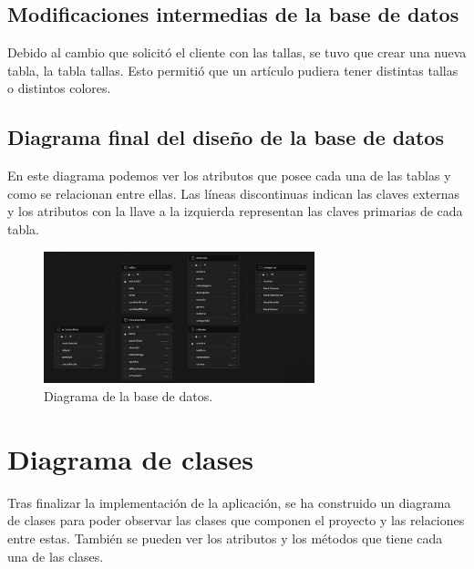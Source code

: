 \subsection{Modificaciones intermedias de la base de datos}

Debido al cambio que solicitó el cliente con las tallas, se tuvo que crear una nueva tabla, la tabla tallas. Esto permitió que un artículo pudiera tener distintas tallas o distintos colores. 


\subsection{Diagrama final del diseño de la base de datos}

En este diagrama podemos ver los atributos que posee cada una de las tablas y como se relacionan entre ellas. Las líneas discontinuas indican las claves externas y los atributos con la llave a la izquierda representan las claves primarias de cada tabla. 

\begin{figure}[H]
	\centering
	\includegraphics[width=0.7\textwidth]{imagenes/imagenesDiagramas/diagramaBD.png}
	\caption{Diagrama de la base de datos.}
	\label{fig:diagramaBD}
\end{figure}

\section{Diagrama de clases}

Tras finalizar la implementación de la aplicación, se ha construido un diagrama de clases para poder observar las clases que componen el proyecto y las relaciones entre estas. También se pueden ver los atributos y los métodos que tiene cada una de las clases. 

\newpage

